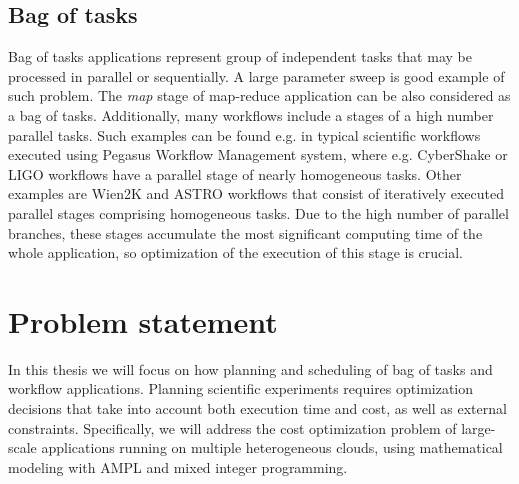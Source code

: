 \subsection{Bag of tasks}

Bag of tasks applications represent group of independent tasks that may be processed in parallel or sequentially. A large parameter sweep is good example of such problem.  The \emph{map} stage of map-reduce application can be also considered as a bag of tasks. Additionally, many workflows include a stages of a high number parallel tasks. Such examples can be found e.g. in typical scientific workflows executed using Pegasus Workflow Management system, where e.g. CyberShake or LIGO workflows  have a parallel stage of nearly homogeneous tasks. Other examples are Wien2K and ASTRO  workflows that consist of iteratively executed parallel stages comprising homogeneous tasks. Due to the high number of parallel branches, these stages accumulate the most significant computing time of the whole application, so optimization of the execution of this stage is crucial.

\section{Problem statement}

 In this thesis we will focus on how planning and scheduling of bag of tasks and workflow applications. Planning scientific experiments requires optimization decisions that take into account both execution time and cost, as well as external constraints. Specifically, we will address the cost optimization problem of large-scale applications running on multiple heterogeneous clouds, using mathematical modeling with AMPL and mixed integer programming.

